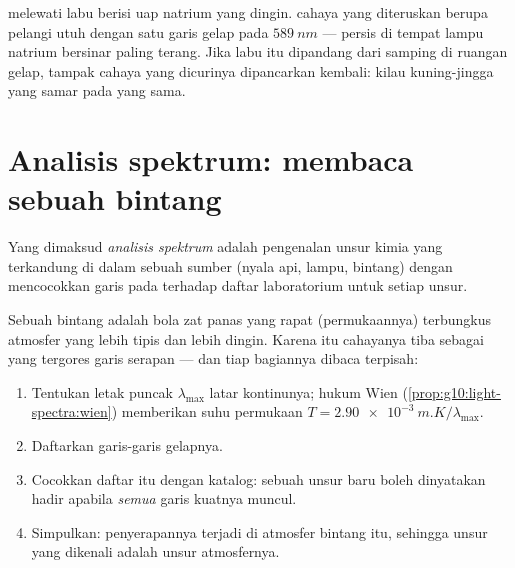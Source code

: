 \begin{example}\label{ex:g10:light-spectra:sodiumflask}
 melewati labu berisi uap natrium yang dingin. 
cahaya yang diteruskan berupa pelangi utuh dengan satu garis gelap pada
$\qty{589}{nm}$ --- persis di tempat lampu natrium bersinar paling
terang. Jika labu itu dipandang dari samping di ruangan gelap, tampak
cahaya yang dicurinya dipancarkan kembali: kilau kuning-jingga yang
samar pada  yang sama.
\end{example}

\section{Analisis spektrum: membaca sebuah bintang}

\begin{definition}\label{def:g10:light-spectra:analysis}
Yang dimaksud \emph{analisis spektrum} adalah
pengenalan unsur kimia yang terkandung di dalam sebuah sumber (nyala
api, lampu, bintang) dengan mencocokkan garis pada  terhadap
daftar laboratorium untuk setiap unsur.
\end{definition}

\begin{method}\label{met:g10:light-spectra:reading}
Sebuah bintang adalah bola zat panas yang rapat (permukaannya)
terbungkus atmosfer yang lebih tipis dan lebih dingin. Karena itu
cahayanya tiba sebagai  yang tergores garis serapan ---
dan tiap bagiannya dibaca terpisah:
\begin{enumerate}
  \item Tentukan letak puncak $\lambda_{\max}$ latar kontinunya; hukum
        Wien (\cref{prop:g10:light-spectra:wien}) memberikan suhu
        permukaan $T = \qty{2.90e-3}{m.K} / \lambda_{\max}$.
  \item Daftarkan  garis-garis gelapnya.
  \item Cocokkan daftar itu dengan katalog: sebuah unsur baru boleh
        dinyatakan hadir apabila \emph{semua} garis kuatnya muncul.
  \item Simpulkan: penyerapannya terjadi di atmosfer bintang itu,
        sehingga unsur yang dikenali adalah unsur atmosfernya.
\end{enumerate}
\end{method}

